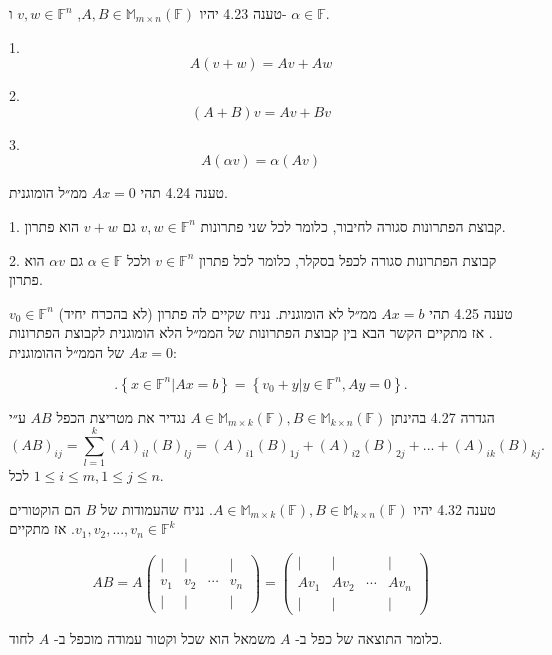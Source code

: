 \documentclass[a4paper, 11pt]{article}
\newcommand{\Set}[1]{\left\{#1\right\}}
\begin{document}
\begin{envbox}[thmcolor]{טענה 4.23}
יהיו $A,B\in\mathbb{M}_{m\times n}(\mathbb{F})$, $v,w\in\mathbb{F}^n$ ו- $\alpha\in\mathbb{F}$.

1.  
\[
A(v+w)=Av+Aw
\]

2.  
\[
(A+B)v=Av+Bv
\]

3.  
\[
A(\alpha v)=\alpha(Av)
\]
\end{envbox}

\begin{envbox}[thmcolor]{טענה 4.24}
תהי $Ax=0$ ממ״ל הומוגנית.

1.  קבוצת הפתרונות סגורה לחיבור, כלומר לכל שני פתרונות $v,w\in\mathbb{F}^n$ גם $v+w$ הוא פתרון.

2.  קבוצת הפתרונות סגורה לכפל בסקלר, כלומר לכל פתרון $v\in\mathbb{F}^n$ ולכל $\alpha\in\mathbb{F}$ גם $\alpha v$ הוא פתרון.
\end{envbox}

\begin{envbox}[thmcolor]{טענה 4.25}
תהי $Ax=b$ ממ״ל לא הומוגנית. נניח שקיים לה פתרון (לא בהכרח יחיד) $v_0\in\mathbb{F}^n$. אז מתקיים הקשר הבא בין קבוצת הפתרונות של הממ״ל הלא הומוגנית לקבוצת הפתרונות של הממ״ל ההומוגנית $Ax=0$:

\[
.\Set{x\in\mathbb{F}^n|Ax=b}=\Set{v_0+y|y\in\mathbb{F}^n,Ay=0}.
\]
\end{envbox}

\begin{envbox}[defcolor]{הגדרה 4.27}
בהינתן $A\in\mathbb{M}_{m\times k}(\mathbb{F}),B\in\mathbb{M}_{k\times n}(\mathbb{F})$ נגדיר את מטריצת הכפל $AB$ ע״י 
\[
(AB)_{ij}=\sum_{l=1}^k (A)_{il}(B)_{lj}=(A)_{i1}(B)_{1j}+(A)_{i2}(B)_{2j}+...+(A)_{ik}(B)_{kj}.
\]
 לכל $1\leq i\leq m, 1\leq j\leq n$.
\end{envbox}

\begin{envbox}[thmcolor]{טענה 4.32}
יהיו $A\in\mathbb{M}_{m\times k}(\mathbb{F}), B\in\mathbb{M}_{k\times n}(\mathbb{F})$. נניח שהעמודות של $B$ הם הוקטורים $v_1,v_2,...,v_n\in\mathbb{F}^k$. אז מתקיים

\[
AB=A\begin{pmatrix}
| & | & & | \\
v_1 & v_2 & \cdots & v_n \\
| & | & & |
\end{pmatrix}=\begin{pmatrix}
| & | & & | \\
Av_1 & Av_2 & \cdots & Av_n \\
| & | & & |
\end{pmatrix}
\]

כלומר התוצאה של כפל ב- $A$ משמאל הוא שכל וקטור עמודה מוכפל ב- $A$ לחוד.
\end{envbox}
\end{document}
